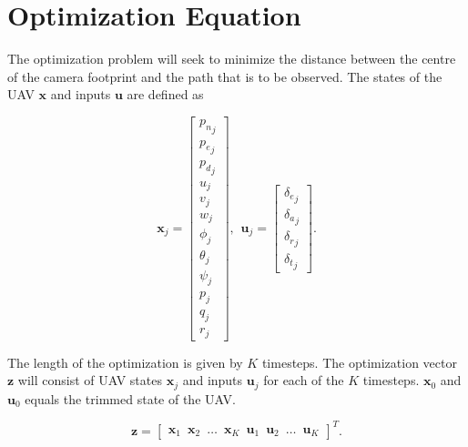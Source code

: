 \section*{Optimization Equation}

The optimization problem will seek to minimize the distance between the centre of the camera footprint and the path that is to be observed. The states of the UAV $\mathbf{x}$ and inputs $\mathbf{u}$ are defined as

\begin{equation}
	\mathbf{x}_j = 
	\begin{bmatrix}
		{p_n}_j 	\\ {p_e}_j		\\ {p_d}_j	\\
		u_j 		\\ v_j   		\\ w_j 	\\ 
		\phi_j	\\ \theta_j	\\ \psi_j	\\
		p_j		\\ q_j		\\ r_j
	\end{bmatrix}, \hspace{5pt}
	\mathbf{u}_j = 
	\begin{bmatrix}
		{\delta_e}_j \\ {\delta_a}_j	\\ {\delta_r}_j	\\ {\delta_t}_j
	\end{bmatrix}.
\end{equation}

The length of the optimization is given by $K$ timesteps. The optimization vector $\mathbf{z}$ will consist of UAV states $\mathbf{x}_j$ and inputs $\mathbf{u}_j$ for each of the $K$ timesteps. $\mathbf{x}_0$ and $\mathbf{u}_0$ equals the trimmed state of the UAV.

\begin{equation}
	\mathbf{z} =
	\begin{bmatrix}
		\mathbf{x}_1 \hspace{6pt} \mathbf{x}_2 \hspace{6pt} \hdots \hspace{6pt} \mathbf{x}_K \hspace{6pt} \mathbf{u}_1 \hspace{6pt} \mathbf{u}_2 \hspace{6pt} \hdots \hspace{6pt} \mathbf{u}_K
	\end{bmatrix}^T.
\end{equation}



